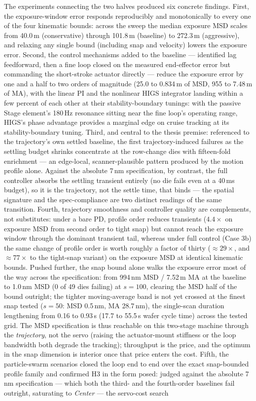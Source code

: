 The experiments connecting the two halves produced six concrete findings. First, the exposure-window error responds reproducibly and monotonically to every one of the four kinematic bounds: across the sweep the median exposure MSD scales from 40.0\,\textmu m (conservative) through 101.8\,\textmu m (baseline) to 272.3\,\textmu m (aggressive), and relaxing any single bound (including snap and velocity) lowers the exposure error. Second, the control mechanisms added to the baseline --- identified lag feedforward, then a fine loop closed on the measured end-effector error but commanding the short-stroke actuator directly --- reduce the exposure error by one and a half to two orders of magnitude (25.0 to 0.834\,\textmu m of MSD, 955 to 7.48\,\textmu m of MA), with the linear PI and the nonlinear HIGS integrator landing within a few percent of each other at their stability-boundary tunings: with the passive Stage element's 180\,Hz resonance sitting near the fine loop's operating range, HIGS's phase advantage provides a marginal edge on cruise tracking at its stability-boundary tuning. Third, and central to the thesis premise: referenced to the trajectory's own settled baseline, the first trajectory-induced failures as the settling budget shrinks concentrate at the row-change dies with fifteen-fold enrichment --- an edge-local, scanner-plausible pattern produced by the motion profile alone. Against the absolute 7\,nm specification, by contrast, the full controller absorbs the settling transient entirely (no die fails even at a 40\,ms budget), so it is the trajectory, not the settle time, that binds --- the spatial signature and the spec-compliance are two distinct readings of the same transition. Fourth, trajectory smoothness and controller quality are complements, not substitutes: under a bare PD, profile order reduces transients ($4.4\times$ on exposure MSD from second order to tight snap) but cannot reach the exposure window through the dominant transient tail, whereas under full control (Case 3b) the same change of profile order is worth roughly a factor of thirty ($\approx 29\times$, and $\approx 77\times$ to the tight-snap variant) on the exposure MSD at identical kinematic bounds. Pushed further, the snap bound alone walks the exposure error most of the way across the specification: from 994\,nm MSD / 7.52\,\textmu m MA at the baseline to 1.0\,nm MSD (0 of 49 dies failing) at $s = 100$, clearing the MSD half of the bound outright; the tighter moving-average band is not yet crossed at the finest snap tested ($s = 50$: MSD 0.5\,nm, MA 28.7\,nm), the single-scan duration lengthening from 0.16 to 0.93\,s (17.7 to 55.5\,s wafer cycle time) across the tested grid. The MSD specification is thus reachable on this two-stage machine through the \textit{trajectory}, not the servo (raising the actuator-mount stiffness or the loop bandwidth both degrade the tracking); throughput is the price, and the optimum in the snap dimension is interior once that price enters the cost. Fifth, the particle-swarm scenarios closed the loop end to end over the exact snap-bounded profile family and confirmed H3 in the form posed: judged against the absolute 7\,nm specification --- which both the third- and the fourth-order baselines fail outright, saturating to \textit{Center} --- the servo-cost search 